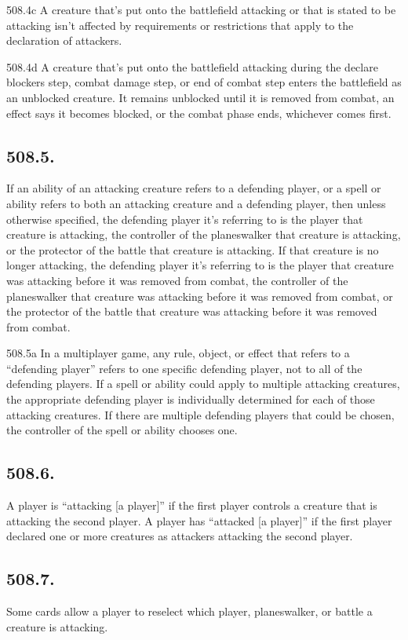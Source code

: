 508.4c A creature that’s put onto the battlefield attacking or that is stated to be attacking isn’t affected by requirements or restrictions that apply to the declaration of attackers.

508.4d A creature that’s put onto the battlefield attacking during the declare blockers step, combat damage step, or end of combat step enters the battlefield as an unblocked creature. It remains unblocked until it is removed from combat, an effect says it becomes blocked, or the combat phase ends, whichever comes first.

\subsection*{508.5.}
If an ability of an attacking creature refers to a defending player, or a spell or ability refers to both an attacking creature and a defending player, then unless otherwise specified, the defending player it’s referring to is the player that creature is attacking, the controller of the planeswalker that creature is attacking, or the protector of the battle that creature is attacking. If that creature is no longer attacking, the defending player it’s referring to is the player that creature was attacking before it was removed from combat, the controller of the planeswalker that creature was attacking before it was removed from combat, or the protector of the battle that creature was attacking before it was removed from combat.

508.5a In a multiplayer game, any rule, object, or effect that refers to a “defending player” refers to one specific defending player, not to all of the defending players. If a spell or ability could apply to multiple attacking creatures, the appropriate defending player is individually determined for each of those attacking creatures. If there are multiple defending players that could be chosen, the controller of the spell or ability chooses one.

\subsection*{508.6.}
A player is “attacking [a player]” if the first player controls a creature that is attacking the second player. A player has “attacked [a player]” if the first player declared one or more creatures as attackers attacking the second player.

\subsection*{508.7.}
Some cards allow a player to reselect which player, planeswalker, or battle a creature is attacking.

